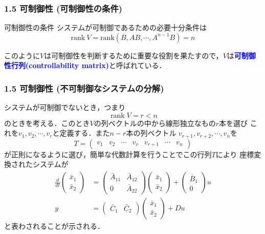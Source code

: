 \documentclass[10pt]{beamer}
\begin{document}
\begin{frame}[t]
\frametitle{1.5 可制御性 (可制御性の条件)}
\begin{block}{可制御性の条件}
システムが可制御であるための必要十分条件は
$$\mbox{rank}\ V = \mbox{rank} (B,AB,\cdots,A^{n-1}B) = n$$
\end{block}
このように$V$は可制御性を判断するために重要な役割を果たすので，$V$は\textcolor{blue}{\bf 可制御性行列(controllability matrix)}と呼ばれている．
\end{frame}


\begin{frame}[t]
\frametitle{1.5 可制御性 (不可制御なシステムの分解)}
システムが可制御でないとき，つまり
\begin{equation}
 \operatorname{rank} V = r < n
\end{equation}
のときを考える．このとき$V$の列ベクトルの中から線形独立なもの$r$本を選び
これを$v_1, v_2, \cdots, v_r$と定義する．また$n-r$本の列ベクトル
$v_{r+1}, v_{r+2}, \cdots, v_n$を
\begin{equation}
 T = \left(\begin{array}{ccccccc}
            v_1 & v_2 & \cdots & v_r & v_{r+1} & \cdots & v_n
     \end{array}\right)
\end{equation}
が正則になるように選び，簡単な代数計算を行うことでこの行列$T$により
座標変換されたシステムが
\begin{align}
 \frac{d}{dt}
  \left(\begin{array}{c}
         \bar{x}_1 \\
   \bar{x}_2
  \end{array}\right)
  &=
  \left(\begin{array}{cc}
         \bar{A}_{11} & \bar{A}_{12} \\
   0            & \bar{A}_{22}
  \end{array}\right)
  \left(\begin{array}{c}
         \bar{x}_1 \\
   \bar{x}_2
  \end{array}\right)
  +
  \left(\begin{array}{c}
         \bar{B}_1 \\
   0
  \end{array}\right)
  u \\
 y &=
  \left(\begin{array}{cc}
         \bar{C}_1 & \bar{C}_2
  \end{array}\right)
  \left(\begin{array}{c}
         \bar{x}_1 \\
   \bar{x}_2
  \end{array}\right)
  + D u
\end{align}
と表わされることが示される．
\end{frame}
\end{document}
